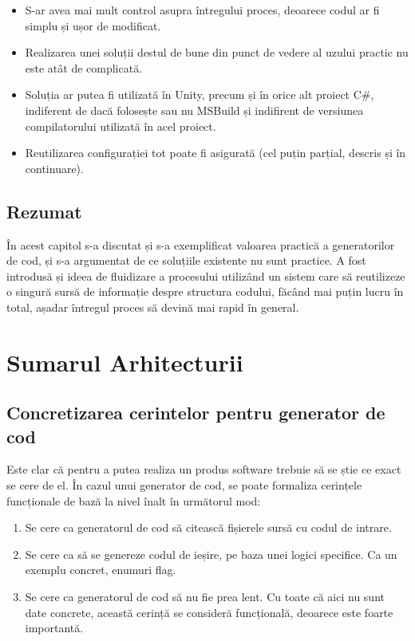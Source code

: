 \documentclass[a4paper,12pt]{report}
\begin{document}
\begin{itemize}
  \item S-ar avea mai mult control asupra întregului proces, deoarece codul ar fi simplu și ușor de modificat.

  \item Realizarea unei soluții destul de bune din punct de vedere al uzului practic nu este atât de complicată.
  
  \item Soluția ar putea fi utilizată în Unity, precum și în orice alt proiect C\#, indiferent de dacă folosește sau nu MSBuild și indifirent de versiunea compilatorului utilizată în acel proiect.
  
  \item Reutilizarea configurației tot poate fi asigurată (cel puțin parțial, descris și în continuare). 
\end{itemize}

\section{Rezumat}

În acest capitol s-a discutat și s-a exemplificat valoarea practică a generatorilor de cod, și s-a argumentat de ce soluțiile existente nu sunt practice.
A fost introdusă și ideea de fluidizare a procesului utilizând un sistem care să reutilizeze o singură sursă de informație despre structura codului, făcând mai puțin lucru în total, așadar întregul proces să devină mai rapid în general.

\chapter{Sumarul Arhitecturii}

\section{Concretizarea cerintelor pentru generator de cod}

Este clar că pentru a putea realiza un produs software trebuie să se știe ce exact se cere de el.
În cazul unui generator de cod, se poate formaliza cerințele funcționale de bază la nivel înalt în următorul mod:

\begin{enumerate}
  \item Se cere ca generatorul de cod să citească fișierele sursă cu codul de intrare.
  \item Se cere ca să se genereze codul de ieșire, pe baza unei logici specifice. Ca un exemplu concret, enumuri flag.
  \item Se cere ca generatorul de cod să nu fie prea lent.
        Cu toate că aici nu sunt date concrete, această cerință se consideră funcțională, deoarece este foarte importantă.
\end{enumerate}
\end{document}
